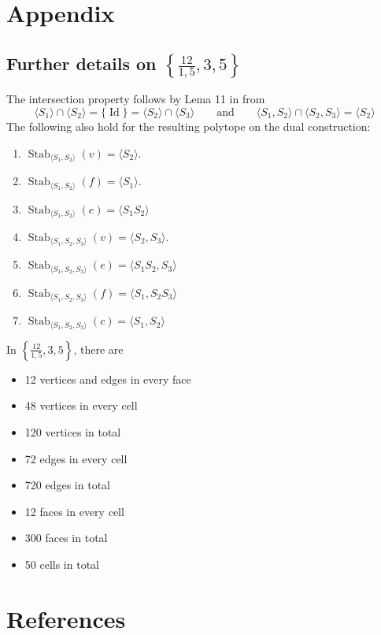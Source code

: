 \documentclass[spanish]{article}
\theoremstyle{definition}
\DeclareMathOperator{\Id}{Id}
\DeclareMathOperator{\Stab}{Stab}
\begin{document}
\clearpage
\section{Appendix}
\subsection{Further details on $\left\{\frac{12}{1,5},3,5\right\}$}
The intersection property follows by Lema 11 in \cite{schulte-chiral} from
\[\langle S_1\rangle\cap\langle S_2\rangle=\{\Id\}=\langle S_2\rangle\cap\langle S_3\rangle\qquad\text{and}\qquad \langle S_1,S_2\rangle\cap\langle S_2,S_3\rangle=\langle S_2\rangle\]
The following also hold for the resulting polytope on the dual construction:
\begin{enumerate}
	\item $\Stab_{\langle S_1,S_2\rangle}(v)=\langle S_2\rangle$.
	\item $\Stab_{\langle S_1,S_2\rangle}(f)=\langle S_1\rangle$.
	\item $\Stab_{\langle S_1,S_2\rangle}(e)=\langle S_1S_2\rangle$
	\item $\Stab_{\langle S_1,S_2,S_3\rangle}(v)=\langle S_2,S_3\rangle$.
	\item $\Stab_{\langle S_1,S_2,S_3\rangle}(e)=\langle S_1S_2,S_3\rangle$
	\item $\Stab_{\langle S_1,S_2,S_3\rangle}(f)=\langle S_1,S_2S_3\rangle$
	\item $\Stab_{\langle S_1,S_2,S_3\rangle}(c)=\langle S_1,S_2\rangle$
\end{enumerate}
In $\left\{\frac{12}{1,5},3,5\right\}$, there are
\begin{itemize}
	\item 12 vertices and edges in every face
	\item 48 vertices in every cell
	\item 120 vertices in total
	\item 72 edges in every cell
	\item 720 edges in total
	\item 12 faces in every cell
	\item 300 faces in total
	\item 50 cells in total
\end{itemize}

\section{References}
\printbibliography[heading=none]
\end{document}
